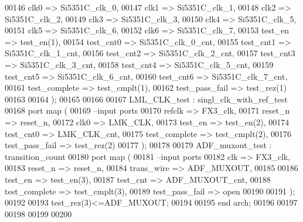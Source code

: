 \begin{DoxyCode}
00146           clk0              => Si5351C_clk_0,
00147           clk1              => Si5351C_clk_1,
00148           clk2              => Si5351C_clk_2,
00149           clk3              => Si5351C_clk_3,
00150           clk4              => Si5351C_clk_5,
00151           clk5              => Si5351C_clk_6,
00152           clk6              => Si5351C_clk_7,         
00153           test_en           => test_en\textcolor{vhdlchar}{(}\textcolor{vhdllogic}{1}\textcolor{vhdlchar}{)},
00154           test_cnt0         => Si5351C_clk_0_cnt,
00155           test_cnt1         => Si5351C_clk_1_cnt,
00156           test_cnt2         => Si5351C_clk_2_cnt,
00157           test_cnt3         => Si5351C_clk_3_cnt,
00158           test_cnt4         => Si5351C_clk_5_cnt,
00159           test_cnt5         => Si5351C_clk_6_cnt,
00160           test_cnt6         => Si5351C_clk_7_cnt,
00161           test_complete => test_cmplt\textcolor{vhdlchar}{(}\textcolor{vhdllogic}{1}\textcolor{vhdlchar}{)},
00162           test_pass_fail    => test_rez\textcolor{vhdlchar}{(}\textcolor{vhdllogic}{1}\textcolor{vhdlchar}{)}
00163      
00164         \textcolor{vhdlchar}{)};        
00165 
00166           
00167 LML\_CLK\_test : singl_clk_with_ref_test
00168   \textcolor{keywordflow}{port} \textcolor{keywordflow}{map} (
00169 \textcolor{keyword}{        --input ports }
00170         refclk          => FX3_clk,
00171         reset_n         => reset_n,
00172           clk0              => LMK_CLK,       
00173           test_en           => test_en\textcolor{vhdlchar}{(}\textcolor{vhdllogic}{2}\textcolor{vhdlchar}{)},
00174           test_cnt0         => LMK_CLK_cnt,
00175           test_complete => test_cmplt\textcolor{vhdlchar}{(}\textcolor{vhdllogic}{2}\textcolor{vhdlchar}{)},
00176           test_pass_fail    => test_rez\textcolor{vhdlchar}{(}\textcolor{vhdllogic}{2}\textcolor{vhdlchar}{)}   
00177         \textcolor{vhdlchar}{)};
00178     
00179 ADF\_muxout\_test : transition_count
00180   \textcolor{keywordflow}{port} \textcolor{keywordflow}{map} (
00181 \textcolor{keyword}{        --input ports }
00182             clk             => FX3_clk,
00183             reset_n         => reset_n,
00184             trans_wire      => ADF_MUXOUT,
00185           
00186             test_en         => test_en\textcolor{vhdlchar}{(}\textcolor{vhdllogic}{3}\textcolor{vhdlchar}{)},
00187             test_cnt            => ADF_MUXOUT_cnt,
00188             test_complete   => test_cmplt\textcolor{vhdlchar}{(}\textcolor{vhdllogic}{3}\textcolor{vhdlchar}{)},
00189             test_pass_fail  => \textcolor{keywordflow}{open}
00190      
00191         \textcolor{vhdlchar}{)};  
00192           
00193 \textcolor{vhdlchar}{test_rez}\textcolor{vhdlchar}{(}\textcolor{vhdllogic}{}\textcolor{vhdllogic}{3}\textcolor{vhdlchar}{)}\textcolor{vhdlchar}{<=}\textcolor{vhdlchar}{ADF_MUXOUT};
00194 
00195 \textcolor{keywordflow}{end} \textcolor{vhdlchar}{arch};
00196 
00197 
00198 
00199 
00200 
\end{DoxyCode}
